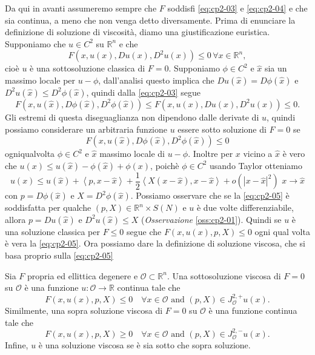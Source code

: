 Da qui in avanti assumeremo sempre che $F$ soddisfi \eqref{eq:cp2-03}
e \eqref{eq:cp2-04} e che sia continua, a meno che non venga detto
diversamente. Prima di enunciare la definizione di soluzione di
viscosità, diamo una giustificazione euristica. Supponiamo che $u\in C^2$ su $\mathbb{R}^n$ e che
\[
F(x,u(x),Du(x),D^2u(x))\leq 0\, \forall x\in\mathbb{R}^n,
\]
cioè $u$ è una sottosoluzione classica di $F=0$. Supponiamo $\phi\in
C^2$ e $\hat{x}$ sia un massimo locale per $u-\phi$, dall'analisi
questo implica che $Du(\hat{x})=D\phi(\hat{x})$ e $D^2u(\hat{x})\leq
D^2\phi(\hat{x})$, quindi dalla \eqref{eq:cp2-03} segue
\[
F(x,u(\hat{x}),D\phi(\hat{x}),D^2\phi(\hat{x}))\leq F(x,u(x),Du(x),D^2u(x))\leq 0.
\]
Gli estremi di questa diseguaglianza non dipendono dalle derivate di $u$, quindi possiamo considerare un arbitraria funzione $u$ essere sotto soluzione di $F=0$ se
\begin{equation}
  \label{eq:cp2-01-add}
  F(x,u(\hat{x}),D\phi(\hat{x}),D^2\phi(\hat{x}))\leq 0
\end{equation}
ogniqualvolta $\phi\in C^2$ e $\hat{x}$ massimo locale di $u-\phi$.
Inoltre  per $x$ vicino a $\hat{x}$ è vero che $u(x)\leq u(\hat{x})-\phi(\hat{x}) + \phi(x)$, poichè $\phi\in C^2$ usando Taylor otteniamo
\begin{equation}
  \label{eq:cp2-05}
  u(x)\leq u(\hat{x})+\left<p,x-\hat{x}\right> + \frac{1}{2}\left<X(x-\hat{x}),x-\hat{x}\right> + o(|x-\hat{x}|^2)\,\, x\to\hat{x}
\end{equation}
con $p=D\phi(\hat{x})$ e $X=D^2\phi(\hat{x})$. Possiamo osservare che se la \eqref{eq:cp2-05} è soddisfatta per qualche $(p,X)\in\mathbb{R}^n\times S(N)$ e $u$ è due volte differenziabile, allora $p=Du(\hat{x})$ e $D^2u(\hat{x})\leq X$ (\emph{Osservazione} \ref{oss:cp2-01}). Quindi se $u$ è una soluzione classica per $F\leq 0$ segue che $F(x,u(x),p,X)\leq 0$ ogni qual volta è vera la \eqref{eq:cp2-05}. Ora possiamo dare la definizione di soluzione viscosa, che si basa proprio sulla \eqref{eq:cp2-05}
\begin{definizione}
\label{def:cp2-01}
Sia $F$ propria ed ellittica degenere e $\mathcal{O}\subset\mathbb{R}^n$.
Una sottosoluzione viscosa di $F=0$ su $\mathcal{O}$ è una funzione $u:\mathcal{O}\to\mathbb{R}$ continua tale che
\begin{equation}
  \label{eq:cp2-06}
  F(x,u(x),p,X)\leq 0\quad\forall x\in\mathcal{O}\text{ and }(p,X)\in J_{\mathcal{O}}^{2,+}u(x).
\end{equation}
Similmente, una sopra soluzione viscosa di $F=0$ su $\mathcal{O}$ è una funzione continua tale che
\begin{equation}
  \label{eq:cp2-07}
  F(x,u(x),p,X)\geq 0\quad\forall x\in\mathcal{O}\text{ and }(p,X)\in J_{\mathcal{O}}^{2,-}u(x).
\end{equation}
Infine, $u$ è una soluzione viscosa se è sia sotto che sopra soluzione.
\end{definizione}
